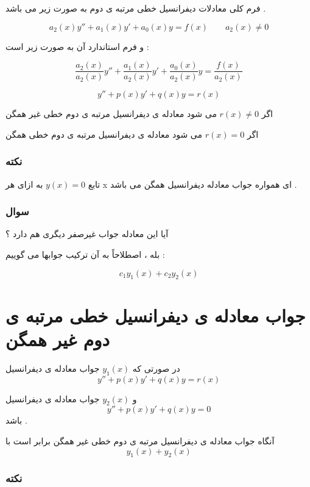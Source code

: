 \documentclass[12pt]{book}
\begin{document}
فرم کلی معادلات دیفرانسیل خطی مرتبه ی دوم به صورت زیر می باشد .

$$
a_{2}(x)y'' + a_{1}(x)y' + a_{0}(x)y = f(x) \qquad a_{2}(x) \neq 0
$$

و فرم استاندارد آن به صورت زیر است :


$$
\frac{a_{2}(x)}{a_{2}(x)}y'' + \frac{a_{1}(x)}{a_{2}(x)}y' + \frac{a_{0}(x)}{a_{2}(x)}y = \frac{f(x)}{a_{2}(x)}
$$

\begin{tcolorbox}
$$
y'' + p(x)y' + q(x)y = r(x)
$$
\end{tcolorbox}

\begin{tcolorbox}
اگر 
$r(x) \neq 0$
می شود معادله ی دیفرانسیل مرتبه ی دوم خطی غیر همگن

اگر 
$r(x) = 0$
می شود معادله ی دیفرانسیل مرتبه ی دوم خطی همگن

\end{tcolorbox}


\subsubsection{نکته}

تابع
$y(x) = 0$
به ازای هر x ای همواره جواب معادله دیفرانسیل همگن می باشد .

\subsubsection{سوال}

آیا این معادله جواب غیرصفر دیگری هم دارد ؟

بله ، اصطلاحاً به آن ترکیب جوابها می گوییم :

\begin{tcolorbox}
$$
c_{1}y_{1}(x) + c_{2}y_{2}(x) 
$$
\end{tcolorbox}


\section{جواب معادله ی دیفرانسیل خطی مرتبه ی دوم غیر همگن}

در صورتی که
$y_{1}(x)$
جواب معادله ی دیفرانسیل
$$
y'' + p(x)y' + q(x)y = r(x)
$$

و 
$y_{2}(x)$
جواب معادله ی دیفرانسیل
$$
y'' + p(x)y' + q(x)y = 0
$$
باشد .

آنگاه جواب معادله ی دیفرانسیل مرتبه ی دوم خطی غیر همگن برابر است با 
$$
y_{1}(x) + y_{2}(x)
$$


\subsubsection{نکته}
\end{document}
